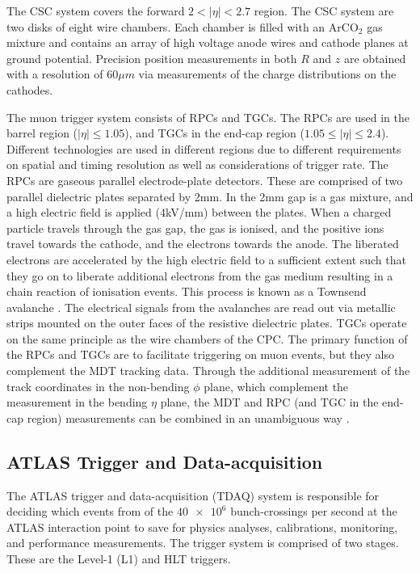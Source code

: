 The CSC system covers the forward $2<|\eta|<2.7$ region. The CSC system are two disks of eight wire chambers. Each chamber is filled with an Ar$\text{CO}_2$ gas mixture and contains an array of high voltage anode wires and cathode planes at ground potential. Precision position measurements in both $R$ and $z$ are obtained with a resolution of $60\mu m$ via measurements of the charge distributions on the cathodes.

The muon trigger system consists of RPCs and TGCs. The RPCs are used in the barrel region ($|\eta|\leq 1.05$), and TGCs in the  end-cap region ($1.05\leq|\eta|\leq 2.4$). Different technologies are used in different regions due to different requirements on spatial and timing resolution as well as considerations of trigger rate. The RPCs are gaseous parallel electrode-plate detectors. These are comprised of two parallel dielectric plates separated by 2mm. In the 2mm gap is a gas mixture, and a high electric field is applied (4kV/mm) between the plates. When a charged particle travels through the gas gap, the gas is ionised, and the positive ions travel towards the cathode, and the electrons towards the anode. The liberated electrons are accelerated by the high electric field to a sufficient extent such that they go on to liberate additional electrons from the gas medium resulting in a chain reaction of ionisation events. This process is known as a Townsend avalanche \cite{ATLAS:townsend}. The electrical signals from the avalanches are read out via metallic strips mounted on the outer faces of the resistive dielectric plates. TGCs operate on the same principle as the wire chambers of the CPC. The primary function of the RPCs and TGCs are to facilitate triggering on muon events, but they also complement the MDT tracking data. Through the additional measurement of the track coordinates in the non-bending $\phi$ plane, which complement the measurement in the bending $\eta$ plane, the MDT and RPC (and TGC in the end-cap region) measurements can be combined in an unambiguous way \cite{Atlas:design,ATLAS:MS}.

\subsection{ATLAS Trigger and Data-acquisition\label{sec:ATLAS:trig}}
The ATLAS trigger and data-acquisition (TDAQ) system is responsible for deciding which events from of the $\num{40e6}$ bunch-crossings per second at the ATLAS interaction point to save for physics analyses, calibrations, monitoring, and performance measurements. The trigger system is comprised of two stages. These are the Level-1 (L1) and HLT triggers. 

